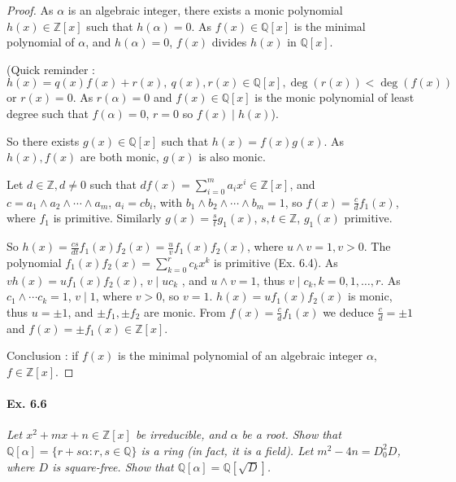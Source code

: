 \documentclass[11pt,a4paper]{article}
\newcommand{\Q}{\mathbb{Q}}
\newcommand{\Z}{\mathbb{Z}}
\begin{document}
\begin{proof}
As $\alpha$ is an algebraic integer, there exists a monic polynomial $h(x) \in \Z[x]$ such that $h(\alpha) = 0$. As $f(x) \in \Q[x]$ is the minimal polynomial  of $\alpha$, and $h(\alpha) = 0$, $f(x)$ divides $h(x)$ in $\Q[x]$.

 (Quick reminder :  $h(x) = q(x) f(x) + r(x),\  q(x),r(x) \in \Q[x],  \deg(r(x)) < \deg(f(x))$ or $r(x) = 0$. As $r(\alpha) = 0$ and $f(x) \in \Q[x]$ is  the monic polynomial of least degree such that $f(\alpha) = 0$, $r =0$ so $f(x) \mid h(x)$).
 
 So there exists $g(x) \in \Q[x]$ such that $h(x) = f(x) g(x)$. As $h(x), f(x)$ are both monic, $g(x)$ is also monic. 
 
 Let $d \in \Z, d\ne 0$ such that $df(x) =\sum_{i=0}^m a_i x^i \in \Z[x]$, and $c = a_1\wedge a_2\wedge \cdots \wedge a_m$, $a_i = c b_i$, with $b_1\wedge b_2\wedge \cdots \wedge b_m = 1$, so
 $f(x) = \frac{c}{d} f_1(x) $, where $f_1$ is primitive. Similarly $g(x) =\frac{s}{t} g_1(x)$, $s ,t \in \Z$,  $g_1(x)$ primitive.
 
 So $h(x) = \frac{cs}{dt} f_1(x) f_2(x) = \frac{u}{v} f_1(x) f_2(x) $, where $u\wedge v = 1, v>0$.
The polynomial $f_1(x)f_2(x) = \sum_{k=0}^r c_k x^k$ is primitive (Ex. 6.4). As $vh(x)= u f_1(x)f_2(x)$, $v \mid uc_k$ , and $u\wedge v = 1$, thus $v \mid c_k, k=0,1,\ldots,r$. As $c_1 \wedge \cdots c_k = 1$, $v \mid 1$, where $v>0$, so $v =  1$. $h(x) = u f_1(x) f_2(x)$ is monic, thus $u=\pm 1$, and $\pm f_1,\pm f_2$ are monic. From $f(x) = \frac{c}{d} f_1(x)$ we deduce $\frac{c}{d} = \pm 1$ and $f(x) = \pm f_1(x) \in \Z[x]$.

Conclusion : if $f(x)$ is the minimal polynomial of an algebraic integer $\alpha$, $f \in \Z[x]$.
\end{proof}

\paragraph{Ex. 6.6}

{\it Let $x^2 + mx + n \in \Z[x]$ be irreducible, and $\alpha$ be a root. Show that $\Q[\alpha] = \{r +s\alpha: r, s \in \Q\}$ is a ring (in fact, it is a field). Let $m^2 - 4n = D_0^2 D$, where $D$ is square-free. Show that $\Q[\alpha] = \Q[\sqrt{D}]$.
}
\end{document}

